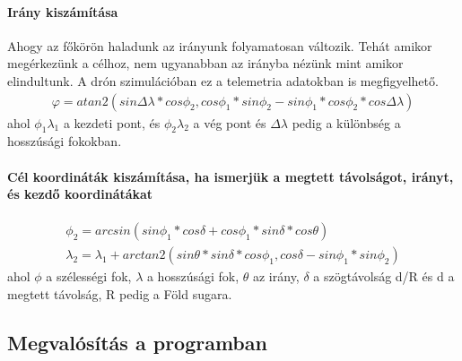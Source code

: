 \paragraph{Irány kiszámítása}
Ahogy az főkörön haladunk az irányunk folyamatosan változik. Tehát amikor megérkezünk a célhoz, nem ugyanabban az irányba nézünk mint amikor elindultunk.
A drón szimulációban ez a telemetria adatokban is megfigyelhető.
\begin{gather*}
    \varphi = atan2(sin\Delta\lambda * cos\phi_{2}, cos\phi_{1} * sin\phi_{2} - sin\phi_{1} * cos\phi_{2} * cos\Delta\lambda)
\end{gather*}
ahol $\phi_{1}\lambda_{1}$ a kezdeti pont, és $\phi_{2}\lambda_{2}$ a vég pont és $\Delta\lambda$ pedig a különbség a hosszúsági fokokban.

\paragraph{Cél koordináták kiszámítása, ha ismerjük a megtett távolságot, irányt, és kezdő koordinátákat}
\begin{gather}
    \phi_{2} = arcsin(sin \phi_{1} * cos \delta + cos \phi_{1} * sin \delta * cos \theta)\\
    \lambda_{2} = \lambda_{1} + arctan2(sin\theta * sin\delta  * cos\phi_{1}, cos\delta - sin\phi_{1} * sin\phi_{2})
\end{gather}
ahol $\phi$ a szélességi fok, $\lambda$ a hosszúsági fok, $\theta$ az irány, $\delta$ a szögtávolság d/R és d a megtett távolság, R pedig a Föld sugara.

\subsection{Megvalósítás a programban}
